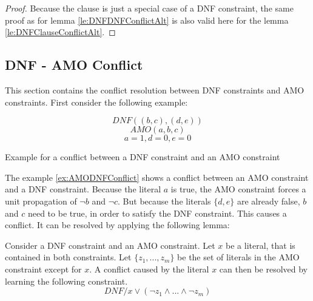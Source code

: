 \begin{proof}
Because the clause is just a special case of a DNF constraint, the same proof as for lemma \ref{le:DNFDNFConflictAlt} is also valid here for the lemma \ref{le:DNFClauseConflictAlt}.
\end{proof}



\subsection{DNF - AMO Conflict}

This section contains the conflict resolution between DNF constraints and AMO constraints. First consider the following example:

\begin{example}
\begin{leftbar}
\begin{displaymath}
DNF((b,c),(d,e))
\end{displaymath}
\begin{displaymath}
AMO(a,b,c)
\end{displaymath}
\begin{displaymath}
a = 1, d = 0, e = 0
\end{displaymath}
\end{leftbar}
\caption{Example for a conflict between a DNF constraint and an AMO constraint}
\label{ex:AMODNFConflict}
\end{example}


The example \ref{ex:AMODNFConflict} shows a conflict between an AMO constraint and a DNF constraint. Because the literal $a$ is true, the AMO constraint forces a unit propagation of $\neg b$ and $\neg c$. But because the literals $\{d,e\}$ are already false, $b$ and $c$ need to be true, in order to satisfy the DNF constraint. This causes a conflict. It can be resolved by applying the following lemma:


\begin{lemma}
\begin{leftbar}
Consider a DNF constraint and an AMO constraint. Let $x$ be a literal, that is contained in both constraints. Let $\{z_1,...,z_m\}$ be the set of literals in the AMO constraint except for $x$. A conflict caused by the literal $x$ can then be resolved by learning the following constraint.
\begin{displaymath}
DNF / x \vee (\neg z_1 \wedge ... \wedge \neg z_m)
\end{displaymath}
\end{leftbar}
\label{le:AMODNFConflict}
\end{lemma}


